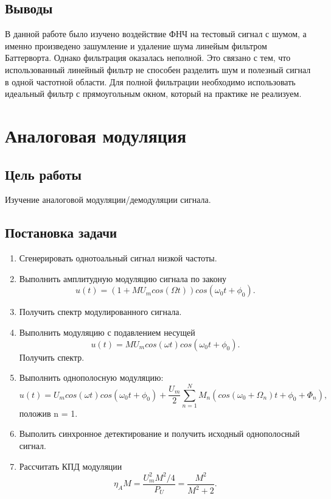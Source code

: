 \documentclass[10pt,a4paper]{article}
\begin{document}
\FloatBarrier

\subsection{Выводы}
В данной работе было изучено воздействие ФНЧ на тестовый сигнал с шумом, а именно произведено зашумление и удаление шума линейым фильтром Баттерворта. Однако фильтрация оказалась неполной. Это связано с тем, что использованный линейный фильтр не способен разделить шум и полезный сигнал в одной частотной области. Для полной фильтрации необходимо использовать идеальный фильтр с прямоугольным окном, который на практике не реализуем.

\newpage
\section{Аналоговая модуляция}

\subsection{Цель работы}
Изучение аналоговой модуляции/демодуляции сигнала.

\subsection{Постановка задачи}
	\begin{enumerate}
		\item Сгенерировать однотоальный сигнал низкой частоты.
		\item Выполнить амплитудную модуляцию сигнала по закону
				\begin{equation}
					u(t) = (1+MU_m cos(\Omega t))cos(\omega_0 t+\phi_0).
				\end{equation}
		\item Получить спектр модулированного сигнала.
		\item Выполнить модуляцию с подавлением несущей 
				\begin{equation}
					u(t) = MU_m cos(\omega t)cos(\omega_0 t+\phi_0).
				\end{equation}
		      Получить спектр. 
		\item Выполнить однополосную модуляцию:
				\begin{equation}
					u(t) = U_m cos(\omega t)cos(\omega_0 t+\phi_0)+\frac{U_m}{2}\sum_{n=1}^N M_n (cos(\omega_0 + \Omega_n )t + \phi_0 + \Phi_n ),
				\end{equation}
				положив n = 1.
		\item Выполить синхронное детектирование и получить исходный однополосный сигнал.
		\item Рассчитать КПД модуляции
				\begin{equation}
					\eta_A M = \frac{U_m ^2 M^2 /4}{P_U} = \frac{M^2}{M^2 + 2}.
				\end{equation}
	\end{enumerate}
\end{document}
